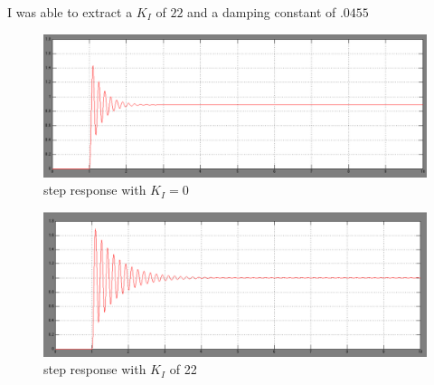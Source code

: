 \documentclass[english]{article}
\begin{document}
I was able to extract a $K_I$ of $22$  and a damping constant of $.0455$ 
\begin{figure}[h!]
\includegraphics[width = \linewidth]{ki_step0.png}
\caption{step response with $K_I = 0 $}
\end{figure}
\FloatBarrier

\begin{figure}[h!]
\includegraphics[width = \linewidth]{ki_step.png}
\caption{step response with $K_I$ of 22 }
\end{figure}
\FloatBarrier 
\end{document}
